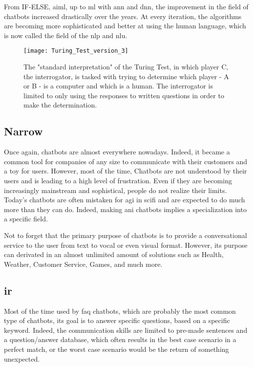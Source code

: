 From IF-ELSE, \gls{aiml}, up to \gls{ml} with \gls{ann} and \gls{dnn}, the improvement in the field of chatbots increased drastically over the years. At every iteration, the algorithms are becoming more sophisticated and better at using the human language, which is now called the field of the \gls{nlp} and \gls{nlu}.

\begin{figure}[ht!]
    \centering
    \texttt{[image: Turing\_Test\_version\_3]}
    \caption{
       The "standard interpretation" of the Turing Test, in which player C, the interrogator, is tasked with trying to determine which player - A or B - is a computer and which is a human. The interrogator is limited to only using the responses to written questions in order to make the determination. \cite{wikipedia:turing_test_img}
    }
    \label{fig:wikipedia_turing_test_img}
\end{figure}

\subsection{Narrow}
Once again, chatbots are almost everywhere nowadays. Indeed, it became a common tool for companies of any size to communicate with their customers and a toy for users. However, most of the time, Chatbots are not understood by their users and is leading to a high level of frustration. Even if they are becoming increasingly mainstream and sophistical, people do not realize their limits. Today's chatbots are often mistaken for \gls{agi} in \gls{scifi} and are expected to do much more than they can do. Indeed, making \gls{ani} chatbots implies a specialization into a specific field.

Not to forget that the primary purpose of chatbots is to provide a conversational service to the user from text to vocal or even visual format. However, its purpose can derivated in an almost unlimited amount of solutions such as Health, Weather, Customer Service, Games, and much more.

\subsection{\gls{ir}}
Most of the time used by \gls{faq} chatbots, which are probably the most common type of chatbots, its goal is to answer specific questions, based on a specific keyword. Indeed, the communication skills are limited to pre-made sentences and a question/answer database, which often results in the best case scenario in a perfect match, or the worst case scenario would be the return of something unexpected.

